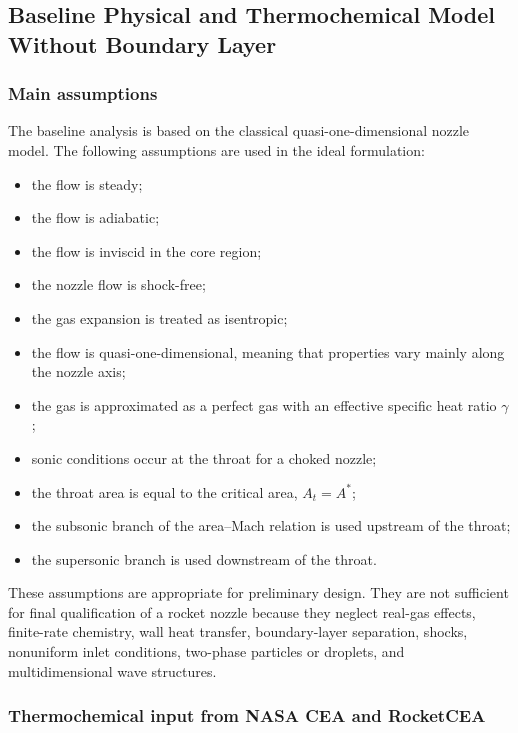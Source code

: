 \documentclass[journal,article,submit,oneauthor]{Definitions/mdpi}
\begin{document}
\subsection{Baseline Physical and Thermochemical Model Without Boundary Layer}

\subsubsection{Main assumptions}

The baseline analysis is based on the classical quasi-one-dimensional nozzle model. The following assumptions are used in the ideal formulation:
\begin{itemize}
    \item the flow is steady;
    \item the flow is adiabatic;
    \item the flow is inviscid in the core region;
    \item the nozzle flow is shock-free;
    \item the gas expansion is treated as isentropic;
    \item the flow is quasi-one-dimensional, meaning that properties vary mainly along the nozzle axis;
    \item the gas is approximated as a perfect gas with an effective specific heat ratio $\gamma$;
    \item sonic conditions occur at the throat for a choked nozzle;
    \item the throat area is equal to the critical area, $A_t=A^*$;
    \item the subsonic branch of the area--Mach relation is used upstream of the throat;
    \item the supersonic branch is used downstream of the throat.
\end{itemize}

These assumptions are appropriate for preliminary design. They are not sufficient for final qualification of a rocket nozzle because they neglect real-gas effects, finite-rate chemistry, wall heat transfer, boundary-layer separation, shocks, nonuniform inlet conditions, two-phase particles or droplets, and multidimensional wave structures.

\subsubsection{Thermochemical input from NASA CEA and RocketCEA}
\end{document}
